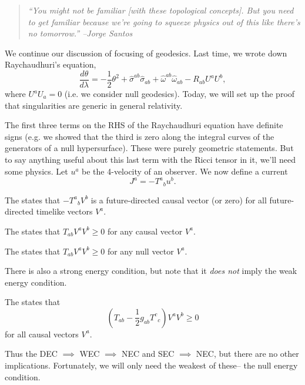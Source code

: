 \begin{quote}
    \textit{``You might not be familiar [with these topological concepts]. But you need to get familiar because we're going to squeeze physics out of this like there's no tomorrow.'' --Jorge Santos}
\end{quote}
We continue our discussion of focusing of geodesics. Last time, we wrote down Raychaudhuri's equation,
\begin{equation*}
    \frac{d\theta}{d\lambda}=-\frac{1}{2} \theta^2 +\hat\sigma^{ab} \hat\sigma_{ab}+\hat \omega^{ab} \hat \omega_{ab} - R_{ab} U^a U^b,
\end{equation*}
where $U^a U_a=0$ (i.e. we consider null geodesics). Today, we will set up the proof that singularities are generic in general relativity.

The first three terms on the RHS of the Raychaudhuri equation have definite signs (e.g. we showed that the third is zero along the integral curves of the generators of a null hypersurface). These were purely geometric statements. But to say anything useful about this last term with the Ricci tensor in it, we'll need some physics. 
Let $u^a$ be the 4-velocity of an observer. We now define a current
\begin{equation}
    J^a=-T^a{}_b u^b.
\end{equation}
\begin{defn}
    The  states that $-T^a{}_b V^b$ is a future-directed causal vector (or zero) for all future-directed timelike vectors $V^a.$
\end{defn}
\begin{defn}
    The  states that $T_{ab}V^a V^b \geq 0$ for any causal vector $V^a$.
\end{defn}
\begin{defn}
    The  states that $T_{ab}V^a V^b \geq 0$ for any null vector $V^a.$
\end{defn}
There is also a strong energy condition, but note that it \emph{does not} imply the weak energy condition.
\begin{defn}
    The  states that
    \begin{equation}
        (T_{ab}-\frac{1}{2}g_{ab}T^c{}_c)V^a V^b \geq 0
    \end{equation}
    for all causal vectors $V^a$.
\end{defn}
Thus the DEC $\implies$ WEC $\implies$ NEC and SEC $\implies$ NEC, but there are no other implications. Fortunately, we will only need the weakest of these-- the null energy condition.

